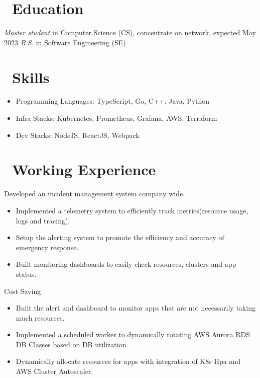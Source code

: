 \documentclass{resume}
\begin{document}



\section{\faGraduationCap\ Education}
\textit{Master student} in Computer Science (CS), concentrate on network, expected May 2023
\textit{B.S.} in Software Engineering (SE)

\section{\faCogs\ Skills}
\begin{itemize}[parsep=0.5ex]
  \item Programming Languages: TypeScript, Go, C++, Java, Python
  \item Infra Stacks: Kubernetes, Prometheus, Grafana, AWS, Terraform
  \item Dev Stacks: NodeJS, ReactJS, Webpack
\end{itemize}

\section{\faUsers\ Working Experience}
Developed an incident management system company wide.
\begin{itemize}
  \item Implemented a telemetry system to efficiently track metrics(resource usage, logs and tracing).
  \item Setup the alerting system to promote the efficiency and accuracy of emergency response.
  \item Built monitoring dashboards to easily check resources, clusters and app status.
\end{itemize}

Cost Saving
\begin{itemize}
  \item Built the alert and dashboard to monitor apps that are not necessarily taking much resources.
  \item Implemented a scheduled worker to dynamically rotating AWS Aurora RDS DB Classes based on DB utilization.
  \item Dynamically allocate resources for apps with integration of K8s Hpa and AWS Cluster Autoscaler.
\end{itemize}
\end{document}
